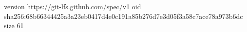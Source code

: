 version https://git-lfs.github.com/spec/v1
oid sha256:68b66344425a3a23eb0417d4e0c191a85b276d7e3d05f3a58c7ace78a973b6dc
size 61
